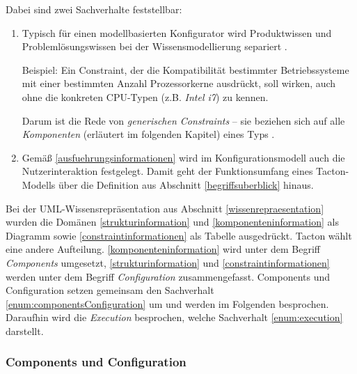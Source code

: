 \documentclass[11pt, a4paper, titlepage, listof=totoc, bibliography=totoc, index=totoc, twoside, openright, headings=normal, draft]{scrreprt}
\begin{document}
Dabei sind zwei Sachverhalte feststellbar:
\begin{enumerate}[(1)]
\item \label{enum:componentsConfiguration} Typisch für einen modellbasierten Konfigurator wird Produktwissen und Problemlösungswissen bei der Wissensmodellierung separiert \citep{felferning14}.

Beispiel: Ein Constraint, der die Kompatibilität bestimmter Betriebssysteme mit einer bestimmten Anzahl Prozessorkerne ausdrückt, soll wirken, auch ohne die konkreten CPU-Typen (z.B. \emph{Intel i7}) zu kennen.

Darum ist die Rede von \emph{generischen Constraints} -- sie beziehen sich auf alle \emph{Komponenten} (erläutert im folgenden Kapitel) eines Typs \citep{felferning14}.
\item \label{enum:execution} Gemäß \eqref{ausfuehrungsinformationen} wird im Konfigurationsmodell auch die Nutzerinteraktion festgelegt. Damit geht der Funktionsumfang eines Tacton-Modells über die Definition aus Abschnitt \ref{begriffsuberblick} hinaus.
\end{enumerate}

Bei der UML-Wissensrepräsentation aus Abschnitt \ref{wissenrepraesentation} wurden die Domänen  \eqref{strukturinformation} und \eqref{komponenteninformation} als Diagramm sowie \eqref{constraintinformationen} als Tabelle ausgedrückt. Tacton wählt eine andere Aufteilung. \eqref{komponenteninformation} wird unter dem Begriff  \emph{Components} umgesetzt, \eqref{strukturinformation} und \eqref{constraintinformationen} werden unter dem Begriff \emph{Configuration} zusammengefasst. Components und Configuration setzen gemeinsam den Sachverhalt \eqref{enum:componentsConfiguration} um und werden im Folgenden besprochen. Daraufhin wird die \emph{Execution} besprochen, welche Sachverhalt \eqref{enum:execution} darstellt.


\subsubsection{Components und Configuration}
\end{document}
